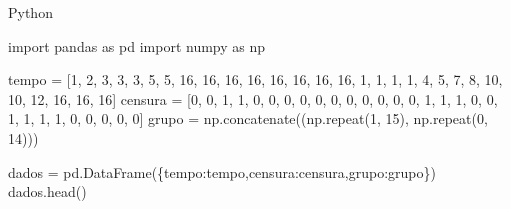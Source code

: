 \documentclass[
  letterpaper,
  DIV=11,
  numbers=noendperiod]{scrreprt}
\newenvironment{Shaded}{\begin{snugshade}}{\end{snugshade}}
\newcommand{\DecValTok}[1]{\textcolor[rgb]{0.68,0.00,0.00}{#1}}
\newcommand{\ImportTok}[1]{\textcolor[rgb]{0.00,0.46,0.62}{#1}}
\newcommand{\NormalTok}[1]{\textcolor[rgb]{0.00,0.46,0.62}{#1}}
\newcommand{\OperatorTok}[1]{\textcolor[rgb]{0.37,0.37,0.37}{#1}}
\newcommand{\StringTok}[1]{\textcolor[rgb]{0.13,0.47,0.30}{#1}}
\begin{document}
Python

\begin{Shaded}
\begin{Highlighting}[]
\ImportTok{import}\NormalTok{ pandas }\ImportTok{as}\NormalTok{ pd}
\ImportTok{import}\NormalTok{ numpy }\ImportTok{as}\NormalTok{ np}

\NormalTok{tempo }\OperatorTok{=}\NormalTok{ [}\DecValTok{1}\NormalTok{, }\DecValTok{2}\NormalTok{, }\DecValTok{3}\NormalTok{, }\DecValTok{3}\NormalTok{, }\DecValTok{3}\NormalTok{, }\DecValTok{5}\NormalTok{, }\DecValTok{5}\NormalTok{, }\DecValTok{16}\NormalTok{, }\DecValTok{16}\NormalTok{, }\DecValTok{16}\NormalTok{, }\DecValTok{16}\NormalTok{, }\DecValTok{16}\NormalTok{, }\DecValTok{16}\NormalTok{, }\DecValTok{16}\NormalTok{, }\DecValTok{16}\NormalTok{, }\DecValTok{1}\NormalTok{, }\DecValTok{1}\NormalTok{, }\DecValTok{1}\NormalTok{, }\DecValTok{1}\NormalTok{, }\DecValTok{4}\NormalTok{, }\DecValTok{5}\NormalTok{, }\DecValTok{7}\NormalTok{, }\DecValTok{8}\NormalTok{, }\DecValTok{10}\NormalTok{, }\DecValTok{10}\NormalTok{, }\DecValTok{12}\NormalTok{, }\DecValTok{16}\NormalTok{, }\DecValTok{16}\NormalTok{, }\DecValTok{16}\NormalTok{]}
\NormalTok{censura }\OperatorTok{=}\NormalTok{ [}\DecValTok{0}\NormalTok{, }\DecValTok{0}\NormalTok{, }\DecValTok{1}\NormalTok{, }\DecValTok{1}\NormalTok{, }\DecValTok{0}\NormalTok{, }\DecValTok{0}\NormalTok{, }\DecValTok{0}\NormalTok{, }\DecValTok{0}\NormalTok{, }\DecValTok{0}\NormalTok{, }\DecValTok{0}\NormalTok{, }\DecValTok{0}\NormalTok{, }\DecValTok{0}\NormalTok{, }\DecValTok{0}\NormalTok{, }\DecValTok{0}\NormalTok{, }\DecValTok{0}\NormalTok{, }\DecValTok{1}\NormalTok{, }\DecValTok{1}\NormalTok{, }\DecValTok{1}\NormalTok{, }\DecValTok{0}\NormalTok{, }\DecValTok{0}\NormalTok{, }\DecValTok{1}\NormalTok{, }\DecValTok{1}\NormalTok{, }\DecValTok{1}\NormalTok{, }\DecValTok{1}\NormalTok{, }\DecValTok{0}\NormalTok{, }\DecValTok{0}\NormalTok{, }\DecValTok{0}\NormalTok{, }\DecValTok{0}\NormalTok{, }\DecValTok{0}\NormalTok{]}
\NormalTok{grupo }\OperatorTok{=}\NormalTok{ np.concatenate((np.repeat(}\DecValTok{1}\NormalTok{, }\DecValTok{15}\NormalTok{), np.repeat(}\DecValTok{0}\NormalTok{, }\DecValTok{14}\NormalTok{)))}

\NormalTok{dados }\OperatorTok{=}\NormalTok{ pd.DataFrame(\{}\StringTok{\textquotesingle{}tempo\textquotesingle{}}\NormalTok{:tempo,}\StringTok{\textquotesingle{}censura\textquotesingle{}}\NormalTok{:censura,}\StringTok{\textquotesingle{}grupo\textquotesingle{}}\NormalTok{:grupo\})}
\NormalTok{dados.head()}
\end{Highlighting}
\end{Shaded}
\end{document}
